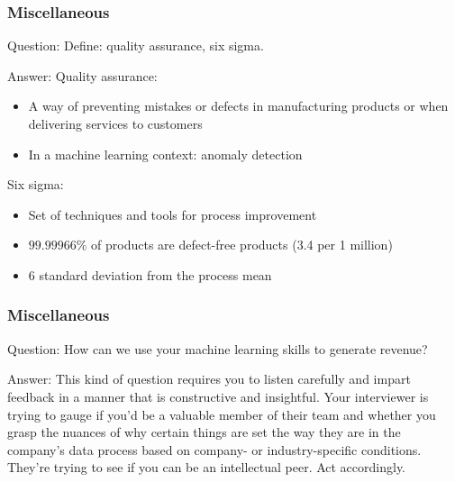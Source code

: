 \documentclass[11pt]{beamer}
\begin{document}
\begin{frame}
\frametitle{Miscellaneous}
\begin{block}{Question:}
	Define: quality assurance, six sigma.
\end{block}
\begin{block}{Answer:}
	Quality assurance:
		\begin{itemize}
			\item A way of preventing mistakes or defects in manufacturing products or when delivering services to customers
			\item In a machine learning context: anomaly detection
		\end{itemize}
	Six sigma:
		\begin{itemize}
			\item Set of techniques and tools for process improvement
			\item $99.99966\%$ of products are defect-free products (3.4 per 1 million)
			\item 6 standard deviation from the process mean
		\end{itemize}
\end{block}
\end{frame}

\begin{frame}
\frametitle{Miscellaneous}
\begin{block}{Question:}
	How can we use your machine learning skills to generate revenue?
\end{block}
\begin{block}{Answer:}
	This kind of question requires you to listen carefully and impart feedback in a manner that is constructive and insightful. Your interviewer is trying to gauge if you’d be a valuable member of their team and whether you grasp the nuances of why certain things are set the way they are in the company’s data process based on company- or industry-specific conditions. They’re trying to see if you can be an intellectual peer. Act accordingly.
\end{block}
\end{frame}
\end{document}
